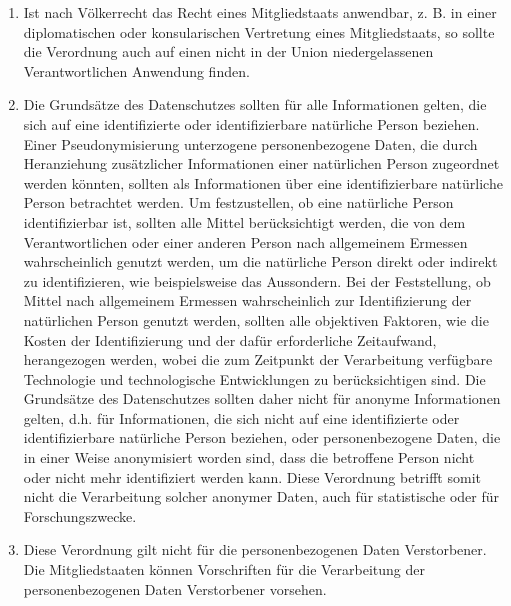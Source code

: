 \begin{enumerate}

   \item Ist nach Völkerrecht das Recht eines Mitgliedstaats anwendbar, z. B. in einer diplomatischen oder
    konsularischen Vertretung eines Mitgliedstaats, so sollte die Verordnung auch auf einen nicht in der Union
    niedergelassenen Verantwortlichen Anwendung finden.%
   \label{itm:eg-25}
   

   \item Die Grundsätze des Datenschutzes sollten für alle Informationen gelten, die sich auf eine identifizierte oder
    identifizierbare natürliche Person beziehen. Einer Pseudonymisierung unterzogene personenbezogene Daten, die durch
    Heranziehung zusätzlicher Informationen einer natürlichen Person zugeordnet werden könnten, sollten als
    Informationen über eine identifizierbare natürliche Person betrachtet werden. Um festzustellen, ob eine natürliche
    Person identifizierbar ist, sollten alle Mittel berücksichtigt werden, die von dem Verantwortlichen oder einer
    anderen Person nach allgemeinem Ermessen wahrscheinlich genutzt werden, um die natürliche Person direkt oder
    indirekt zu identifizieren, wie beispielsweise das Aussondern. Bei der Feststellung, ob Mittel nach allgemeinem
    Ermessen wahrscheinlich zur Identifizierung der natürlichen Person genutzt werden, sollten alle objektiven
    Faktoren, wie die Kosten der Identifizierung und der dafür erforderliche Zeitaufwand, herangezogen werden, wobei
    die zum Zeitpunkt der Verarbeitung verfügbare Technologie und technologische Entwicklungen zu berücksichtigen sind.
    Die Grundsätze des Datenschutzes sollten daher nicht für anonyme Informationen gelten, d.h. für Informationen, die
    sich nicht auf eine identifizierte oder identifizierbare natürliche Person beziehen, oder personenbezogene Daten,
    die in einer Weise anonymisiert worden sind, dass die betroffene Person nicht oder nicht mehr identifiziert werden
    kann. Diese Verordnung betrifft somit nicht die Verarbeitung solcher anonymer Daten, auch für statistische oder für
    Forschungszwecke.%
   \label{itm:eg-26}
   

   \item Diese Verordnung gilt nicht für die personenbezogenen Daten Verstorbener. Die Mitgliedstaaten können
    Vorschriften für die Verarbeitung der personenbezogenen Daten Verstorbener vorsehen.%
   \label{itm:eg-27}
   

\end{enumerate}
